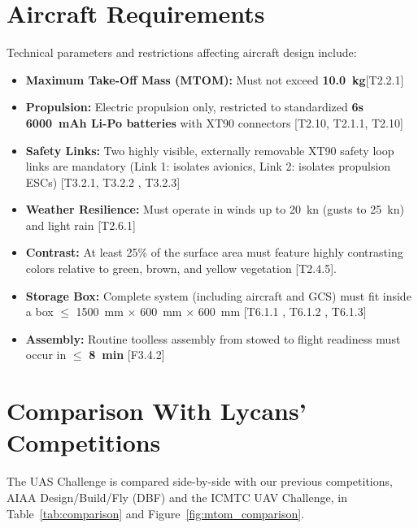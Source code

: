 \documentclass[11pt,a4paper]{article}
\begin{document}
\section{Aircraft Requirements}
Technical parameters and restrictions affecting aircraft design include:
\begin{itemize}
    \item \textbf{Maximum Take-Off Mass (MTOM):} Must not exceed \textbf{\SI{10.0}{\kilogram}}[T2.2.1]
    \item \textbf{Propulsion:} Electric propulsion only, restricted to standardized \textbf{6s 6000~mAh Li-Po batteries} with XT90 connectors [T2.10, T2.1.1, T2.10]
    \item \textbf{Safety Links:} Two highly visible, externally removable XT90 safety loop links are mandatory (Link 1: isolates avionics, Link 2: isolates propulsion ESCs) [T3.2.1, T3.2.2 , T3.2.3]
    
    \item \textbf{Weather Resilience:} Must operate in winds up to \SI{20}{\knot} (gusts to \SI{25}{\knot}) and light rain [T2.6.1]
    
    \item \textbf{Contrast:} At least 25\% of the surface area must feature highly contrasting colors relative to green, brown, and yellow vegetation [T2.4.5].

    
    \item \textbf{Storage Box:} Complete system (including aircraft and GCS) must fit inside a box $\le$ \SI{1500}{\milli\meter} $\times$ \SI{600}{\milli\meter} $\times$ \SI{600}{\milli\meter} [T6.1.1 , T6.1.2 , T6.1.3]

    \item \textbf{Assembly:} Routine toolless assembly from stowed to flight readiness must occur in $\le$ \textbf{\SI{8}{\minute}}
    [F3.4.2]



\end{itemize}

\section{Comparison With Lycans' Competitions}
The UAS Challenge is compared side-by-side with our previous competitions, AIAA Design/Build/Fly (DBF) and the ICMTC UAV Challenge, in Table~\ref{tab:comparison} and Figure~\ref{fig:mtom_comparison}.
\end{document}
